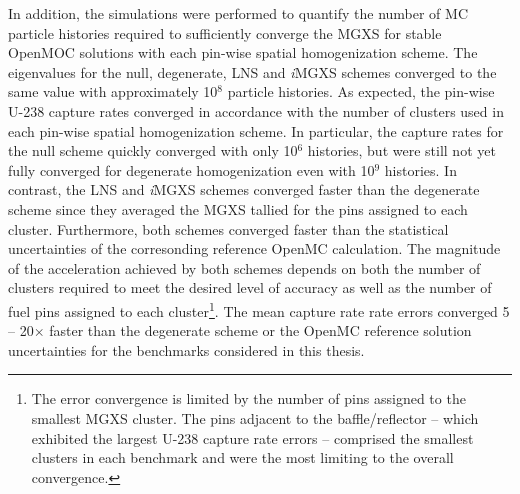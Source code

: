 
In addition, the simulations were performed to quantify the number of \ac{MC} particle histories required to sufficiently converge the \ac{MGXS} for stable OpenMOC solutions with each pin-wise spatial homogenization scheme. The eigenvalues for the null, degenerate, \ac{LNS} and \textit{i}\ac{MGXS} schemes converged to the same value with approximately 10$^{8}$ particle histories. As expected, the pin-wise U-238 capture rates converged in accordance with the number of clusters used in each pin-wise spatial homogenization scheme. In particular, the capture rates for the null scheme quickly converged with only 10$^{6}$ histories, but were still not yet fully converged for degenerate homogenization even with 10$^{9}$ histories. In contrast, the \ac{LNS} and \textit{i}\ac{MGXS} schemes converged faster than the degenerate scheme since they averaged the \ac{MGXS} tallied for the pins assigned to each cluster. Furthermore, both schemes converged faster than the statistical uncertainties of the corresonding reference OpenMC calculation. The magnitude of the acceleration achieved by both schemes depends on both the number of clusters required to meet the desired level of accuracy as well as the number of fuel pins assigned to each cluster\footnote{The error convergence is limited by the number of pins assigned to the smallest \ac{MGXS} cluster. The pins adjacent to the baffle/reflector -- which exhibited the largest U-238 capture rate errors -- comprised the smallest clusters in each benchmark and were the most limiting to the overall convergence.}. The mean capture rate rate errors converged 5 -- 20$\times$ faster than the degenerate scheme or the OpenMC reference solution uncertainties for the benchmarks considered in this thesis.



